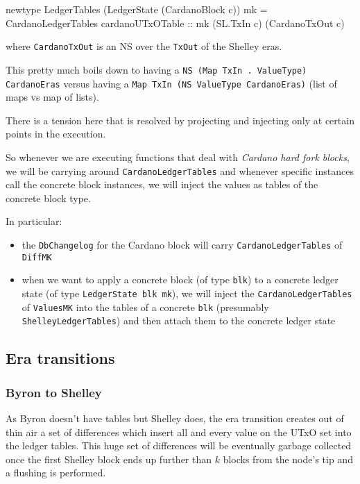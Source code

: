 \documentclass[11pt,a4paper]{article}
\newcommand{\htt}[1]{\texttt{#1}}
\theoremstyle{definition}
\begin{document}
\begin{code}
newtype LedgerTables (LedgerState (CardanoBlock c)) mk = CardanoLedgerTables {
  cardanoUTxOTable :: mk (SL.TxIn c) (CardanoTxOut c)
  }
\end{code}
where \texttt{CardanoTxOut} is an NS over the \texttt{TxOut} of the Shelley
eras.

This pretty much boils down to having a \htt{NS (Map TxIn . ValueType) CardanoEras} versus having a \htt{Map TxIn (NS ValueType CardanoEras)} (list of maps vs map of lists).

There is a tension here that is resolved by projecting and injecting only at
certain points in the execution.

So whenever we are executing functions that deal with \emph{Cardano hard fork
  blocks}, we will be carrying around \htt{CardanoLedgerTables} and whenever
specific instances call the concrete block instances, we will inject the values
as tables of the concrete block type.

In particular:
\begin{itemize}
  \item the \htt{DbChangelog} for the Cardano block will carry
        \htt{CardanoLedgerTables} of \htt{DiffMK}
  \item when we want to apply a concrete block (of type \htt{blk}) to a concrete
        ledger state (of type \htt{LedgerState blk mk}), we will inject the
        \htt{CardanoLedgerTables} of \htt{ValuesMK} into the tables of a
        concrete \htt{blk} (presumably \htt{ShelleyLedgerTables}) and then
        attach them to the concrete ledger state
\end{itemize}


\subsection{Era transitions}
\label{sec:eratrans}

\subsubsection{Byron to Shelley}

As Byron doesn't have tables but Shelley does, the era transition creates out of
thin air a set of differences which insert all and every value on the UTxO set
into the ledger tables. This huge set of differences will be eventually garbage
collected once the first Shelley block ends up further than $k$ blocks from the
node's tip and a flushing is performed.
\end{document}
